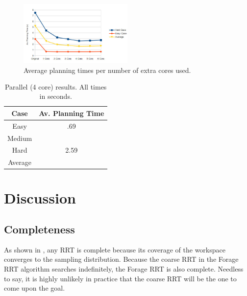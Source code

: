 \documentclass[conference]{IEEEtran}
\begin{document}
\begin{figure}[h!]
  \centering
    \includegraphics[width=0.5\textwidth]{figures/ParallelResults.jpg}
  \caption{Average planning times per number of extra cores used. \label{fig:ParallelResults} }
\end{figure}

\begin{table}
        \centering
        \begin{tabular}{| c | c | }
                \hline
                Case & \textbf{Av. Planning Time} \\  \hline
                Easy & .69 \\  \hline
		Medium & \\  \hline
		Hard & 2.59 \\  \hline
		Average &\textbf{} \\  \hline
        \end{tabular}
        \caption{Parallel (4 core) results. All times in seconds.}
        \label{tab:Results}
\end{table}



\section{Discussion}
\subsection{Completeness}
As shown in \cite{lavalle00}, any RRT is complete because its coverage of the workspace converges to the sampling distribution. Because the
coarse RRT in the Forage RRT algorithm searches indefinitely, the Forage RRT is also complete. Needless to say, it is highly unlikely in
practice that the coarse RRT will be the one to come upon the goal.
\end{document}
